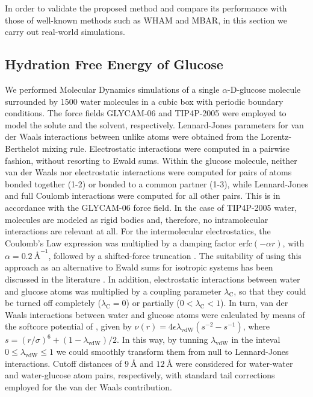 \documentclass[journal=jctcce,manuscript=article,layout=twocolumn]{achemso}
\begin{document}
In order to validate the proposed method and compare its performance with those of well-known methods such as WHAM and MBAR, in this section we carry out real-world simulations.

\subsection{Hydration Free Energy of Glucose}

We performed Molecular Dynamics simulations of a single $\alpha$-D-glucose molecule surrounded by 1500 water molecules in a cubic box with periodic boundary conditions. The force fields GLYCAM-06 \cite{Kirschner_2007} and TIP4P-2005 \cite{Abascal_2005} were employed to model the solute and the solvent, respectively. Lennard-Jones parameters for van der Waals interactions between unlike atoms were obtained from the Lorentz-Berthelot mixing rule. Electrostatic interactions were computed in a pairwise fashion, without resorting to Ewald sums. Within the glucose molecule, neither van der Waals nor electrostatic interactions were computed for pairs of atoms bonded together (1-2) or bonded to a common partner (1-3), while Lennard-Jones and full Coulomb interactions were computed for all other pairs. This is in accordance with the GLYCAM-06 \cite{Kirschner_2007} force field. In the case of TIP4P-2005 \cite{Abascal_2005} water, molecules are modeled as rigid bodies and, therefore, no intramolecular interactions are relevant at all. For the intermolecular electrostatics, the Coulomb's Law expression was multiplied by a damping factor $\text{erfc}(-\alpha r)$, with $\alpha = 0.2~\text{\AA}^{-1}$, followed by a shifted-force truncation \cite{Allen_1987}. The suitability of using this approach as an alternative to Ewald sums for isotropic systems has been discussed in the literature \cite{Fennell_2006}. In addition, electrostatic interactions between water and glucose atoms was multiplied by a coupling parameter $\lambda_\text{C}$, so that they could be turned off completely ($\lambda_\text{C} = 0$) or partially ($0 < \lambda_\text{C} < 1$). In turn, van der Waals interactions between water and glucose atoms were calculated by means of the softcore potential of \citeauthor{Beutler_1994} \cite{Beutler_1994}, given by $\nu(r) = 4\epsilon\lambda_\text{vdW}(s^{-2} - s^{-1})$, where $s = (r/\sigma)^6 + (1-\lambda_\text{vdW})/2$. In this way, by tunning $\lambda_\text{vdW}$ in the inteval $0 \le \lambda_\text{vdW} \le 1$ we could smoothly transform them from null to Lennard-Jones interactions. Cutoff distances of $9~\text{\AA}$ and $12~\text{\AA}$ were considered for water-water and water-glucose atom pairs, respectively, with standard tail corrections employed for the van der Waals contribution.
\end{document}
